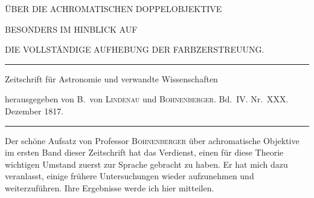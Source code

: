 \begin{center}
{\Large ÜBER DIE ACHROMATISCHEN DOPPELOBJEKTIVE\par}
\vspace{6mm}
{\large BESONDERS IM HINBLICK AUF\par}
\vspace{4mm}
{\large DIE VOLLSTÄNDIGE AUFHEBUNG DER FARBZERSTREUUNG.\par}
\vspace{7mm}\hrule\vspace{2mm}
Zeitschrift für Astronomie und verwandte Wissenschaften\par
herausgegeben von B.\ von \textsc{Lindenau} und \textsc{Bohnenberger}. Bd.\ IV. Nr.\ XXX. Dezember 1817.
\vspace{2mm}\hrule\vspace{5mm}
\end{center}
Der schöne Aufsatz von Professor \textsc{Bohnenberger} über achromatische Objektive im ersten Band dieser Zeitschrift hat das Verdienst, einen für diese Theorie wichtigen Umstand zuerst zur Sprache gebracht zu haben. Er hat mich dazu veranlasst, einige frühere Untersuchungen wieder aufzunehmen und weiterzuführen. Ihre Ergebnisse werde ich hier mitteilen.

